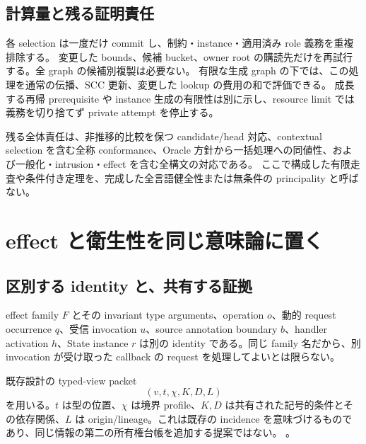 \documentclass[11pt,a4paper]{article}
\theoremstyle{remark}
\newcommand{\newsrc}[2]{\href{https://github.com/momota1029/yulang/blob/d5552b3e328e53c3a60170329cd2192e4e11c097/#1}{\texttt{\detokenize{#2}}}}
\begin{document}
\subsection{計算量と残る証明責任}

各 selection は一度だけ commit し、制約・instance・適用済み role 義務を重複排除する。
変更した bounds、候補 bucket、owner root の購読先だけを再試行する。全 graph の候補別複製は必要ない。
有限な生成 graph の下では、この処理を通常の伝播、SCC 更新、変更した lookup の費用の和で評価できる。
成長する再帰 prerequisite や instance 生成の有限性は別に示し、resource limit では義務を切り捨てず private attempt を停止する。

残る全体責任は、非推移的比較を保つ candidate/head 対応、contextual selection を含む全称 conformance、Oracle 方針から一括処理への同値性、および一般化・intrusion・effect を含む全構文の対応である。
ここで構成した有限走査や条件付き定理を、完成した全言語健全性または無条件の principality と呼ばない。


\section{effect と衛生性を同じ意味論に置く}

\subsection{区別する identity と、共有する証拠}

effect family $F$ とその invariant type arguments、operation $o$、動的 request occurrence $q$、受信 invocation $u$、source annotation boundary $b$、handler activation $h$、State instance $r$ は別の identity である。同じ family 名だから、別 invocation が受け取った callback の request を処理してよいとは限らない。

既存設計の typed-view packet
\[
(v,t,\chi,K,D,L)
\]
を用いる。$t$ は型の位置、$\chi$ は境界 profile、$K,D$ は共有された記号的条件とその依存関係、$L$ は origin/lineage。これは既存の incidence を意味づけるものであり、同じ情報の第二の所有権台帳を追加する提案ではない。
\newsrc{notes/design/2026-10-02-typed-boundary-realization-draft.md\#L730-L753}{typed view packet}。
\end{document}
